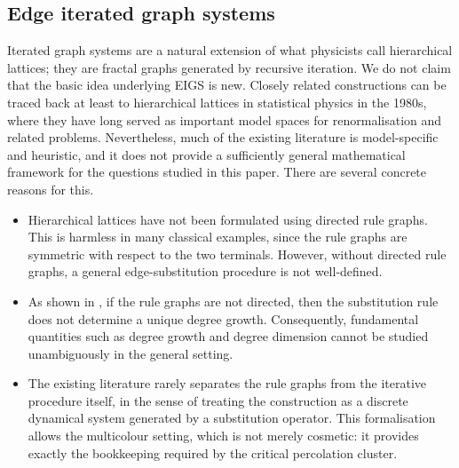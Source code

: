 \documentclass{article}
\theoremstyle{plain}
\theoremstyle{definition}
\begin{document}


\subsection{Edge iterated graph systems}\label{subsec:eigs}

Iterated graph systems are a natural extension of what physicists call hierarchical lattices; they
are fractal graphs generated by recursive iteration.
We do not claim that the basic idea underlying EIGS is new.
Closely related constructions can be traced back at least to hierarchical lattices in statistical physics in the 1980s, where they have long served as important model spaces for renormalisation and related problems. Nevertheless, much of the existing literature is model-specific and heuristic, and it does not provide a sufficiently general mathematical framework for the questions studied in this paper. 
There are several concrete reasons for this.

\begin{itemize}
    \item Hierarchical lattices have not been formulated using directed rule graphs. 
    This is harmless in many classical examples, since the rule graphs are symmetric with respect to the two terminals. However, without directed rule graphs, a general edge-substitution procedure is not well-defined.

    \item As shown in \cite{li2024on}, if the rule graphs are not directed, then the substitution rule does not determine a unique degree growth. Consequently, fundamental quantities such as degree growth and degree dimension cannot be studied unambiguously in the general setting.

    \item The existing literature rarely separates the rule graphs from the iterative procedure itself, in the sense of treating the construction as a discrete dynamical system generated by a substitution operator. 
    This formalisation allows the multicolour setting, which is not merely cosmetic: it provides exactly the bookkeeping required by the critical percolation cluster.
\end{itemize}
\end{document}
